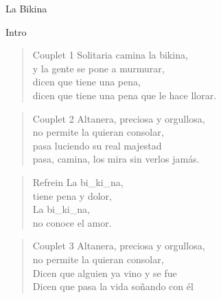 \begin{song}[joropo]{La Bikina}
\begin{instrumental}{Intro}
 \measure{}  \measure{}  \measure{}          
\end{instrumental}

\begin{verse}{Couplet 1}
Solitaria camina la bikina,\\
y la gente se pone a murmurar,\hspace{1em}\\
dicen que tiene una pena,\\
dicen que tiene una pena que le hace llorar. 
\end{verse}

\begin{verse}{Couplet 2}
Altanera, preciosa y orgullosa,\\
no permite la quieran consolar, \hspace{1em}\\
pasa luciendo su real majestad\\
pasa, camina, los mira sin verlos jamás.
\end{verse}

\begin{verse}{Refrein}
La bi\_ki\_na,\hspace{1em}\\
tiene pena y dolor,\\
La bi\_ki\_na,\hspace{1em}\\
no conoce el amor. \hspace{1em} \hspace{1em}
\end{verse}

\begin{verse}{Couplet 3}
Altanera, preciosa y orgullosa,\\
no permite la quieran consolar, \\
Dicen que alguien ya vino y se fue\\
Dicen que pasa la vida soñando con él
\end{verse}


\end{song}
